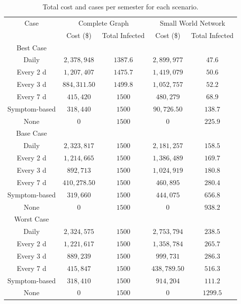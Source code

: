 \documentclass[fullpage]{extarticle}
\begin{document}
\begin{table}[b!]
\begin{Large}
\begin{center}
\begin{tabular}{|c||c|c||c|c|}\hline
Case 							&\multicolumn{2}{c||}{Complete Graph	}		&\multicolumn{2}{c|}{Small World Network}		\\  \cline{2-5}
 									&Cost (\$)			& Total Infected			&Cost (\$)			& Total Infected			\\ \hline\hline
Best Case 				&							&															&							&		\\ \hline
Daily 							& $2,378,948$					& $1387.6$ 				& $2,899,977$				&	$47.6$\\ \hline
Every 2 d					& $1,207,407$					& $1475.7$ 				& $1,419,079$				&	$50.6$\\ \hline
Every 3 d					& $884,311.50$				& $1499.8$ 				& $1,052,757$				&	$52.2$\\ \hline
Every 7 d					& $415,420$						& $1500$ 					& $480,279$					&	$68.9$\\ \hline
Symptom-based	& $318,440$						& $1500$ 					& $90,726.50$				&	$138.7$\\ \hline
None							& $0$									& $1500$ 					& $0$								&	$225.9$\\ \hline\hline
Base Case 				&							&															&							&		\\ \hline
Daily 							& $2,323,817$			& $1500$ 								& $2,181,257$			&	$158.5$\\ \hline
Every 2 d					& $1,214,665$			& $1500$ 								& $1,386,489$			&	$169.7$\\ \hline
Every 3 d					& $892,713$				& $1500$ 								& $1,024,919$			&	$180.8$\\ \hline
Every 7 d					& $410,278.50$		& $1500$ 								& $460,895$				&	$280.4$\\ \hline
Symptom-based	& $319,660$				& $1500$ 								& $444,075$				&	$656.8$\\ \hline
None							& $0$							& $1500$ 								& $0$							&	$938.2$\\ \hline\hline
Worst Case 			&							&															&							&		\\ \hline
Daily 							& $2,324,575$				& $1500$ 							& $2,753,794$				&	$238.5$\\ \hline
Every 2 d					& $1,221,617$				& $1500$ 							& $1,358,784$				&	$265.7$\\ \hline
Every 3 d					& $889,239$					& $1500$ 							& $999,731$					&	$286.3$\\ \hline
Every 7 d					& $415,847$					& $1500$ 							& $438,789.50$			&	$516.3$\\ \hline
Symptom-based	& $318,410$					& $1500$ 							& $914,204$					&	$111.2$\\ \hline
None							& $0$								& $1500$ 							& $0$								&	$1299.5$\\ \hline

\end{tabular}
\caption{\label{table:cases}Total cost and cases per semester for each scenario.}
\end{center}
\end{Large}
\end{table}
\end{document}
